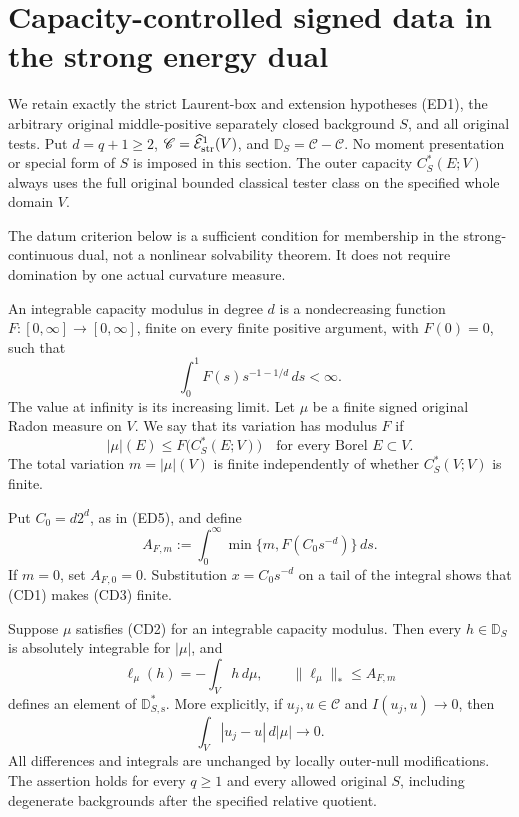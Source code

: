 \section{Capacity-controlled signed data in the strong energy dual}
\label{sec:r12-capacity-dual-data}

We retain exactly the strict Laurent-box and extension hypotheses
(ED1), the arbitrary original middle-positive separately closed
background $S$, and all original tests. Put $d=q+1\geq2$,
$\mathscr C=\widehat{\mathcal E}^{1}_{\rm str}(V)$, and
$\mathbb D_S=\mathscr C-\mathscr C$. No moment presentation or
special form of $S$ is imposed in this section. The outer capacity
$C_S^*(E;V)$ always uses the full original bounded classical tester
class on the specified whole domain $V$.

The datum criterion below is a sufficient condition for membership
in the strong-continuous dual, not a nonlinear solvability theorem.
It does not require domination by one actual curvature measure.

\begin{definition}
\label{def:r12-integrable-capacity-modulus}
An integrable capacity modulus in degree $d$ is a nondecreasing
function $F:[0,\infty]\to[0,\infty]$, finite on every finite
positive argument, with $F(0)=0$, such that
\[
                 \int_0^1 F(s)s^{-1-1/d}\,ds<\infty.
 \tag{CD1}
\]
The value at infinity is its increasing limit. Let $\mu$ be a
finite signed original Radon measure on $V$. We say that its
variation has modulus $F$ if
\[
                    |\mu|(E)\leq F\bigl(C_S^*(E;V)\bigr)
                    \quad\text{for every Borel }E\subset V.
 \tag{CD2}
\]
The total variation $m=|\mu|(V)$ is finite independently of
whether $C_S^*(V;V)$ is finite.
\end{definition}

Put $C_0=d2^d$, as in (ED5), and define
\[
       A_{F,m}:=\int_0^\infty
              \min\{m,F(C_0s^{-d})\}\,ds.
 \tag{CD3}
\]
If $m=0$, set $A_{F,0}=0$. Substitution $x=C_0s^{-d}$ on a
tail of the integral shows that (CD1) makes (CD3) finite.

\begin{theorem}
\label{thm:r12-capacity-modulus-strong-dual}
Suppose $\mu$ satisfies (CD2) for an integrable capacity modulus.
Then every $h\in\mathbb D_S$ is absolutely integrable for
$|\mu|$, and
\[
       \ell_\mu(h)=-\int_V h\,d\mu,
       \qquad
       \|\ell_\mu\|_*\leq A_{F,m}
 \tag{CD4}
\]
defines an element of $\mathbb D_{S,\mathrm s}^*$.
More explicitly, if $u_j,u\in\mathscr C$ and $I(u_j,u)\to0$,
then
\[
                    \int_V|u_j-u|\,d|\mu|\longrightarrow0.
 \tag{CD5}
\]
All differences and integrals are unchanged by locally outer-null
modifications. The assertion holds for every $q\geq1$ and every
allowed original $S$, including degenerate backgrounds after the
specified relative quotient.
\end{theorem}

